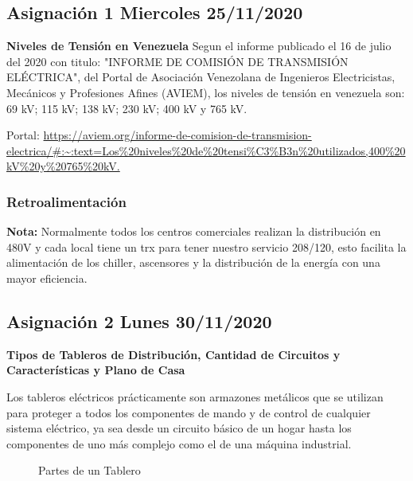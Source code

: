 \documentclass[11pt,letterpaper]{article}
\begin{document}
\subsection{Asignación 1 Miercoles 25/11/2020}
\textbf{Niveles de Tensión en Venezuela}
Segun el informe publicado el 16 de julio del 2020 con titulo: "INFORME DE COMISIÓN DE TRANSMISIÓN ELÉCTRICA", del Portal de Asociación Venezolana de Ingenieros Electricistas, Mecánicos y Profesiones Afines (AVIEM), los niveles de tensión en venezuela son: 69 kV; 115 kV; 138 kV; 230 kV; 400 kV y 765 kV.

Portal: \url{https://aviem.org/informe-de-comision-de-transmision-electrica/#:~:text=Los%20niveles%20de%20tensi%C3%B3n%20utilizados,400%20kV%20y%20765%20kV.}


\subsubsection{Retroalimentación}
\textbf{Nota:} Normalmente todos los centros comerciales realizan la distribución en 480V y cada local tiene un trx para tener nuestro servicio 208/120, esto facilita la alimentación de los chiller, ascensores y la distribución de la energía con una mayor eficiencia.\\

\subsection{Asignación 2 Lunes 30/11/2020}
\textbf{Tipos de Tableros de Distribución, Cantidad de Circuitos y Características y Plano de Casa}

	Los tableros eléctricos prácticamente son armazones metálicos que se utilizan para proteger a todos los componentes de mando y de control de cualquier sistema eléctrico, ya sea desde un circuito básico de un hogar hasta los componentes de uno más complejo como el de una máquina industrial.

\begin{figure}[ht!]
	\centering
	\caption{Partes de un Tablero}
\end{figure}
\end{document}
